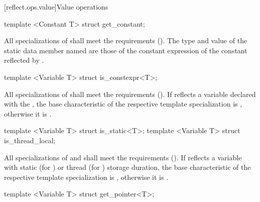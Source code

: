 [reflect.ops.value]{Value operations}

\begin{std.txt}\color{addclr}

\begin{itemdecl}
template <Constant T> struct get_constant;
\end{itemdecl}

\begin{itemdescr}
\pnum
All specializations of  shall meet the  requirements (). The type and value of the static data member named  are those of the constant expression of the constant reflected by .

\end{itemdescr}

\begin{itemdecl}
template <Variable T> struct is_constexpr<T>;
\end{itemdecl}

\begin{itemdescr}
\pnum
All specializations of  shall meet the  requirements (). If  reflects a variable declared with the  , the base characteristic of the respective template specialization is , otherwise it is .
\end{itemdescr}

\begin{itemdecl}
template <Variable T> struct is_static<T>;
template <Variable T> struct is_thread_local;
\end{itemdecl}

\begin{itemdescr}
\pnum
All specializations of  and  shall meet the  requirements (). If  reflects a variable with static (for ) or thread (for ) storage duration, the base characteristic of the respective template specialization is , otherwise it is .
\end{itemdescr}

\begin{itemdecl}
template <Variable T> struct get_pointer<T>;
\end{itemdecl}


\end{std.txt}
